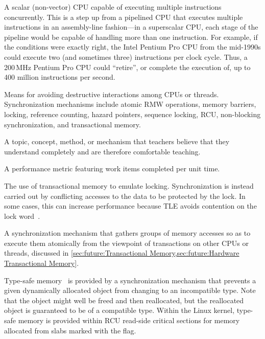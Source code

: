 \begin{description}
	A scalar (non-vector) CPU capable of executing multiple instructions
	concurrently.
	This is a step up from a pipelined CPU that executes multiple
	instructions in an assembly-line fashion---in a superscalar
	CPU, each stage of the pipeline would be capable of handling
	more than one instruction.
	For example, if the conditions were exactly right,
	the Intel Pentium Pro CPU from the mid-1990s could
	execute two (and sometimes three) instructions per clock cycle.
	Thus, a 200\,MHz Pentium Pro CPU could ``retire'', or complete the
	execution of, up to 400 million instructions per second.
\item[\IXG{Synchronization}:]
	Means for avoiding destructive interactions among CPUs or threads.
	Synchronization mechanisms include atomic RMW operations, memory
	barriers, locking, reference counting, hazard pointers, sequence
	locking, RCU, non-blocking synchronization, and transactional
	memory.
\item[\IXG{Teachable}:]
	A topic, concept, method, or mechanism that teachers believe that
	they understand completely and are therefore comfortable teaching.
\item[\IXG{Throughput}:]
	A performance metric featuring work items completed per unit time.
\item[Transactional Lock Elision (TLE):]
	The use of transactional memory to emulate locking.
	Synchronization is instead carried out by conflicting accesses
	to the data to be protected by the lock.
	In some cases, this can increase performance because TLE
	avoids contention on the lock
	word~\cite{MartinPohlack2011HTM2TLE,Kleen:2014:SEL:2566590.2576793,PascalFelber2016rwlockElision,SeongJaePark2020HTMRCUlock}.
\item[Transactional Memory (TM):]
	A synchronization mechanism that gathers groups of memory
	accesses so as to execute them atomically from the viewpoint
	of transactions on other CPUs or threads, discussed in
	\cref{sec:future:Transactional Memory,sec:future:Hardware Transactional Memory}.
\item[\IXG{Type-Safe Memory}:]
	Type-safe memory~\cite{Cheriton96a} is provided by a
	synchronization mechanism that prevents a given dynamically
	allocated object from changing to an incompatible type.
	Note that the object might well be freed and then reallocated, but
	the reallocated object is guaranteed to be of a compatible type.
	Within the Linux kernel, type-safe memory is provided within
	RCU read-side critical sections for memory allocated from slabs
	marked with the  flag.

\end{description}
